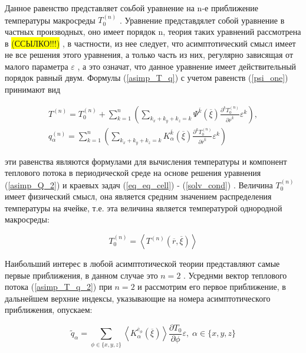 Данное равенство представляет соьбой уравнение на n-е приближение температуры макросреды 
$T^{(n)}_0$
. Уравнение представдялет собой уравнение в частных
производных, оно имеет порядок n, теория таких уравнений рассмотрена в 
\colorbox{yellow}{(ССЫЛКО!!!)}
, в частности, из нее следует, что асимптотический смысл имеет не 
все решения этого уравнения, а только часть из них, регулярно зависящая от малого параметра 
$\varepsilon$
, а это означат, что данное уравнение
имеет действительный порядок равный двум.
Формулы 
(\ref{asimp_T_q})
с учетом равенств 
(\ref{psi_one})
принимают вид

\begin{equation}
    \label{asimp_T_q_2}
    \begin{aligned}
        T^{(n)} = T^{(n)}_0 +
        \sum^n_{k=1} \left( \sum_{k_x+k_y+k_z=k} \Psi^{\overline{k}}(\overline{\xi})  
        \frac{\partial^kT^{(n)}_0}{\partial \overline{r}^{\overline{k}}}\varepsilon^k \right) ,
        \\
        q^{(n)}_{\alpha} = 
        \sum^n_{k=1} \left( \sum_{k_x+k_y+k_z=k} K^{\overline{k}}_{\alpha}(\overline{\xi})  
        \frac{\partial^kT^{(n)}_0}{\partial \overline{r}^{\overline{k}}}\varepsilon^k \right)
    \end{aligned}
\end{equation}

эти равенства являются формулами для вычисления температуры и компонент теплового потока в периодической среде на основе решения уравнения 
(\ref{asimp_Q_2})
и краевых задач 
(\ref{eq_eq_cell})
-
(\ref{solv_cond})
. Величина 
$T^{(n)}_0$ 
имеет физический смысл, она является средним значением распределения температуры на ячейке, т.е. эта величина является 
температурой однородной макросреды:

\begin{equation}
    T^{(n)}_0 = \left< T^{(n)} \left( \overline{r}, \overline{\xi} \right)  \right> 
\end{equation}

Наибольший интерес в любой асимптотической теории представляют самые первые приближения, в данном случае это 
$n=2$
. Усреднми вектор теплового потока 
(\ref{asimp_T_q_2})
при 
$n=2$
и рассмотрим его первое приближение, в дальнейшем верхние индексы, указывающие на номера асимптотического приближения, опускаем:

\begin{equation}
    \label{asimp_q_n_2}
    \widetilde{q}_{\alpha} = 
    \sum_{\phi \in \{x,y,z\}} \left< K^{ \overline{e}_{\phi}}_{\alpha} \left( \overline{\xi} \right)  \right> 
    \frac{\partial T_0}{\partial \phi} \varepsilon
    , \; \alpha \in \{x,y,z\}
\end{equation}


